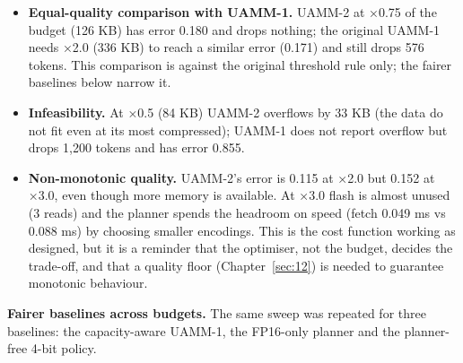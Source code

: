 \documentclass[12pt,a4paper]{report}
\begin{document}
\begin{itemize}
\item \textbf{Equal-quality comparison with UAMM-1.} UAMM-2 at ×0.75 of the budget (126 KB) has error 0.180 and drops nothing; the original UAMM-1 needs ×2.0 (336 KB) to reach a similar error (0.171) and still drops 576 tokens. This comparison is against the original threshold rule only; the fairer baselines below narrow it.
\item \textbf{Infeasibility.} At ×0.5 (84 KB) UAMM-2 overflows by 33 KB (the data do not fit even at its most compressed); UAMM-1 does not report overflow but drops 1,200 tokens and has error 0.855.
\item \textbf{Non-monotonic quality.} UAMM-2's error is 0.115 at ×2.0 but 0.152 at ×3.0, even though more memory is available. At ×3.0 flash is almost unused (3 reads) and the planner spends the headroom on speed (fetch 0.049 ms vs 0.088 ms) by choosing smaller encodings. This is the cost function working as designed, but it is a reminder that the optimiser, not the budget, decides the trade-off, and that a quality floor (Chapter~\ref{sec:12}) is needed to guarantee monotonic behaviour.
\end{itemize}
\textbf{Fairer baselines across budgets.} The same sweep was repeated for three baselines: the capacity-aware UAMM-1, the FP16-only planner and the planner-free 4-bit policy.
\end{document}
